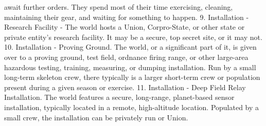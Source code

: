         await further orders. They spend most of their time exercising, cleaning, maintaining their
        gear, and waiting for something to happen.
    9.  Installation - Research Facility - The world hosts a Union, Corpro-State, or other state or
        private entity’s research facility. It may be a secure, top secret site, or it may not.
    10. Installation - Proving Ground. The world, or a significant part of it, is given over to a
        proving ground, test field, ordnance firing range, or other large-area hazardous testing,
        training, measuring, or dumping installation. Run by a small long-term skeleton crew, there
        typically is a larger short-term crew or population present during a given season or
        exercise.
    11. Installation - Deep Field Relay Installation. The world features a secure, long-range,
        planet-based sensor installation, typically located in a remote, high-altitude location.
        Populated by a small crew, the installation can be privately run or Union.




